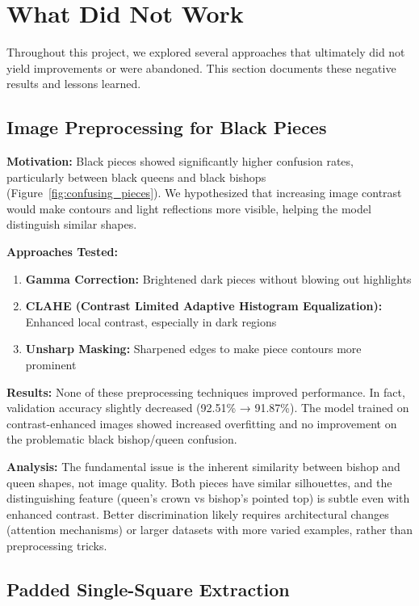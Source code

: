 \documentclass[conference]{IEEEtran}
\begin{document}
\section{What Did Not Work}

Throughout this project, we explored several approaches that ultimately did not yield improvements or were abandoned. This section documents these negative results and lessons learned.

\subsection{Image Preprocessing for Black Pieces}

\textbf{Motivation:} Black pieces showed significantly higher confusion rates, particularly between black queens and black bishops (Figure~\ref{fig:confusing_pieces}). We hypothesized that increasing image contrast would make contours and light reflections more visible, helping the model distinguish similar shapes.

\textbf{Approaches Tested:}
\begin{enumerate}
    \item \textbf{Gamma Correction:} Brightened dark pieces without blowing out highlights
    \item \textbf{CLAHE (Contrast Limited Adaptive Histogram Equalization):} Enhanced local contrast, especially in dark regions
    \item \textbf{Unsharp Masking:} Sharpened edges to make piece contours more prominent
\end{enumerate}

\textbf{Results:} None of these preprocessing techniques improved performance. In fact, validation accuracy slightly decreased (92.51\% → 91.87\%). The model trained on contrast-enhanced images showed increased overfitting and no improvement on the problematic black bishop/queen confusion.

\textbf{Analysis:} The fundamental issue is the inherent similarity between bishop and queen shapes, not image quality. Both pieces have similar silhouettes, and the distinguishing feature (queen's crown vs bishop's pointed top) is subtle even with enhanced contrast. Better discrimination likely requires architectural changes (attention mechanisms) or larger datasets with more varied examples, rather than preprocessing tricks.

\subsection{Padded Single-Square Extraction}
\end{document}
